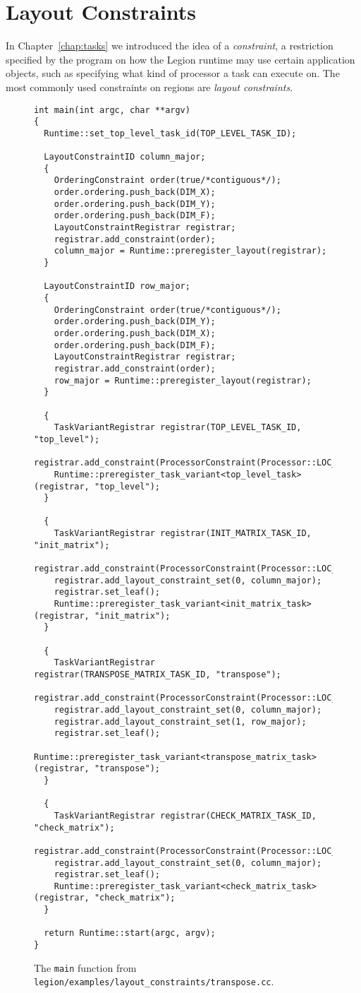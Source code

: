 \section{Layout Constraints}
\label{sec:layout}
In Chapter~\ref{chap:tasks} we introduced the idea of a {\em constraint}, a restriction specified by the program on how the Legion runtime
may use certain application objects, such as specifying what kind of processor a task can execute on.  The most commonly used constraints
on regions are {\em layout constraints}.


\begin{figure}
\begin{lstlisting}
int main(int argc, char **argv)
{
  Runtime::set_top_level_task_id(TOP_LEVEL_TASK_ID);

  LayoutConstraintID column_major;
  {
    OrderingConstraint order(true/*contiguous*/);
    order.ordering.push_back(DIM_X);
    order.ordering.push_back(DIM_Y);
    order.ordering.push_back(DIM_F);
    LayoutConstraintRegistrar registrar;
    registrar.add_constraint(order);
    column_major = Runtime::preregister_layout(registrar);
  }

  LayoutConstraintID row_major;
  {
    OrderingConstraint order(true/*contiguous*/);
    order.ordering.push_back(DIM_Y);
    order.ordering.push_back(DIM_X);
    order.ordering.push_back(DIM_F);
    LayoutConstraintRegistrar registrar;
    registrar.add_constraint(order);
    row_major = Runtime::preregister_layout(registrar);
  }

  {
    TaskVariantRegistrar registrar(TOP_LEVEL_TASK_ID, "top_level");
    registrar.add_constraint(ProcessorConstraint(Processor::LOC_PROC));
    Runtime::preregister_task_variant<top_level_task>(registrar, "top_level");
  }

  {
    TaskVariantRegistrar registrar(INIT_MATRIX_TASK_ID, "init_matrix");
    registrar.add_constraint(ProcessorConstraint(Processor::LOC_PROC));
    registrar.add_layout_constraint_set(0, column_major); 
    registrar.set_leaf();
    Runtime::preregister_task_variant<init_matrix_task>(registrar, "init_matrix");
  }

  {
    TaskVariantRegistrar registrar(TRANSPOSE_MATRIX_TASK_ID, "transpose");
    registrar.add_constraint(ProcessorConstraint(Processor::LOC_PROC));
    registrar.add_layout_constraint_set(0, column_major);
    registrar.add_layout_constraint_set(1, row_major);
    registrar.set_leaf();
    Runtime::preregister_task_variant<transpose_matrix_task>(registrar, "transpose");
  }

  {
    TaskVariantRegistrar registrar(CHECK_MATRIX_TASK_ID, "check_matrix");
    registrar.add_constraint(ProcessorConstraint(Processor::LOC_PROC));
    registrar.add_layout_constraint_set(0, column_major);
    registrar.set_leaf();
    Runtime::preregister_task_variant<check_matrix_task>(registrar, "check_matrix");
  }

  return Runtime::start(argc, argv);
}
\end{lstlisting}
\caption{The {\tt main} function from {\tt legion/examples/layout\_constraints/transpose.cc}.}
\label{fig:layout}
\end{figure}

